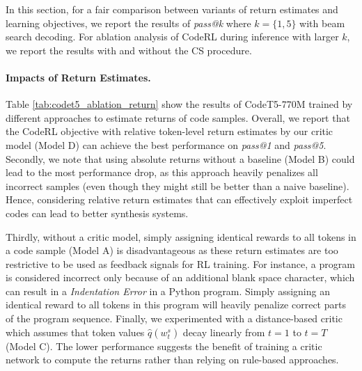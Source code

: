 \documentclass{article}
\begin{document}
In this section, for a fair comparison between variants of return estimates and learning objectives, we report the results of \emph{pass@k} where $k=\{1,5\}$ with beam search decoding.
For ablation analysis of CodeRL during inference with larger $k$, we report the results with and without the CS procedure. 



\paragraph{Impacts of Return Estimates.}
Table \ref{tab:codet5_ablation_return} show the results of CodeT5-770M trained by different approaches to estimate returns of code samples.
Overall, we report that the CodeRL objective with relative token-level return estimates by our critic model (Model D) can achieve the best performance on \emph{pass@1} and \emph{pass@5}.
Secondly, we note that using absolute returns without a baseline (Model B) could lead to the most performance drop, as this approach heavily penalizes all incorrect samples (even though they might still be better than a naive baseline).
Hence, considering relative return estimates that can effectively exploit imperfect codes can lead to better synthesis systems. 

Thirdly, without a critic model, simply assigning identical rewards to all tokens in a code sample (Model A) is disadvantageous as these return estimates are too restrictive to be used as feedback signals for RL training. 
For instance, a program is considered incorrect only because of an additional blank space character, which can result in a \emph{Indentation Error} in a Python program. 
Simply assigning an identical reward to all tokens in this program will heavily penalize correct parts of the program sequence. 
Finally, we experimented with a distance-based critic which assumes that token values $\hat{q}(w^s_t)$ decay linearly from $t=1$ to $t=T$ (Model C). 
The lower performance suggests the benefit of training a critic network to compute the returns rather than relying on rule-based approaches. 
\end{document}
